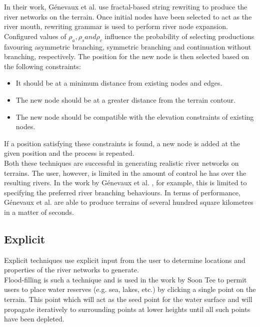 In their work, Génevaux et al. \cite{Genevaux2013} use fractal-based string rewriting to produce the river networks on the terrain. Once initial nodes have been selected to act as the river mouth, rewriting grammar is used to perform river node expansion. Configured values of $\rho_{a}, \rho_{s} and \rho_{c}$ influence the probability of selecting productions favouring asymmetric branching, symmetric branching and continuation without branching, respectively. The position for the new node is then selected based on the following constraints:
\begin{itemize}
\item It should be at a minimum distance from existing nodes and edges.
\item The new node should be at a greater distance from the terrain contour.
\item The new node should be compatible with the elevation constraints of existing nodes.
\end{itemize}
If a position satisfying these constraints is found, a new node is added at the given position and the process is repeated.\\

Both these techniques are successful in generating realistic river networks on terrains. The user, however, is limited in the amount of control he has over the resulting rivers. In the work by Génevaux et al. \cite{Genevaux2013}, for example, this is limited to specifying the preferred river branching behaviours. In terms of performance, Génevaux et al. \cite{Genevaux2013} are able to produce terrains of several hundred square kilometres in a matter of seconds.

\subsection{Explicit}

Explicit techniques use explicit input from the user to determine locations and properties of the river networks to generate.\\

Flood-filling is such a technique and is used in the work by Soon Tee \cite{Teoh2008} to permit users to place water reserves (e.g. sea, lakes, etc.) by clicking a single point on the terrain. This point which will act as the seed point for the water surface and will propagate iteratively to surrounding points at lower heights until all such points have been depleted. \\

